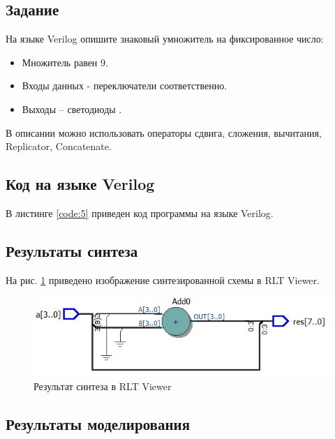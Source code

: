 \subsection{Задание}

\noindent На языке Verilog опишите знаковый умножитель на фиксированное число:
\begin{itemize}
	\item Множитель равен 9.
	\item Входы данных - переключатели  соответственно.
	\item Выходы – светодиоды .
\end{itemize}

\noindent В описании можно использовать операторы сдвига, сложения, вычитания, Replicator, Concatenate.

\subsection{Код на языке Verilog}

В листинге \ref{code:5} приведен код программы на языке Verilog.



\subsection{Результаты синтеза}

На рис. \ref{fig:elab2_2_rtl} приведено изображение синтезированной схемы в RLT Viewer.

\begin{figure}[H]
\begin{center}
	\includegraphics[scale=0.9]{elab2_2_rtl}
	\caption{Результат синтеза в RLT Viewer}
	\label{fig:elab2_2_rtl}
\end{center}
\end{figure}

\subsection{Результаты моделирования}
\label{sec:elab2_2_modeling}

